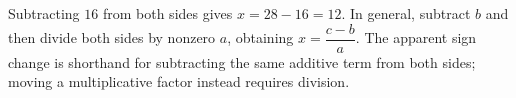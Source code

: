 Subtracting $16$ from both sides gives $x=28-16=\boxed{12}$. In general, subtract $b$ and then divide both sides by nonzero $a$, obtaining $\boxed{x=\dfrac{c-b}{a}}$. The apparent sign change is shorthand for subtracting the same additive term from both sides; moving a multiplicative factor instead requires division.
